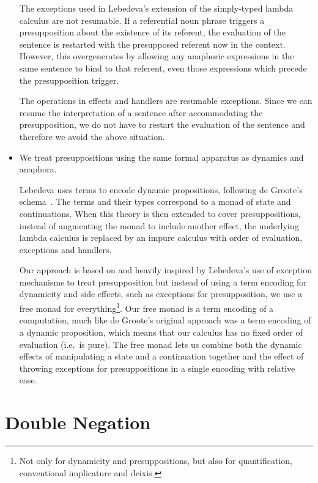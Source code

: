 \begin{itemize}
  The exceptions used in Lebedeva's extension of the simply-typed lambda
  calculus are not resumable. If a referential noun phrase triggers a
  presupposition about the existence of its referent, the evaluation of the
  sentence is restarted with the presupposed referent now in the
  context. However, this overgenerates by allowing any anaphoric
  expressions in the same sentence to bind to that referent, even those
  expressions which precede the presupposition trigger.

  \begin{exe}
  \end{exe}

  The operations in effects and handlers are resumable exceptions. Since we
  can resume the interpretation of a sentence after accommodating the
  presupposition, we do not have to restart the evaluation of the sentence
  and therefore we avoid the above situation.

\item We treat presuppositions using the same formal apparatus as dynamics
  and anaphora.

  Lebedeva uses terms to encode dynamic propositions, following de Groote's
  schema~\cite{de2006towards}. The terms and their types correspond to a
  monad of state and continuations. When this theory is then extended to
  cover presuppositions, instead of augmenting the monad to include another
  effect, the underlying lambda calculus is replaced by an impure calculus
  with order of evaluation, exceptions and handlers.

  Our approach is based on and heavily inspired by Lebedeva's use of
  exception mechanisms to treat presupposition but instead of using a term
  encoding for dynamicity and side effects, such as exceptions for
  presupposition, we use a free monad for everything\footnote{Not only for
    dynamicity and presuppositions, but also for quantification,
    conventional implicature and deixis.}. Our free monad is a term
  encoding of a computation, much like de Groote's original approach was a
  term encoding of a dynamic proposition, which means that our calculus has
  no fixed order of evaluation (i.e.\ is pure). The free monad lets us
  combine both the dynamic effects of manipulating a state and a
  continuation together and the effect of throwing exceptions for
  presuppositions in a single encoding with relative ease.
\end{itemize}


\section{Double Negation}
\label{sec:double-negation}

